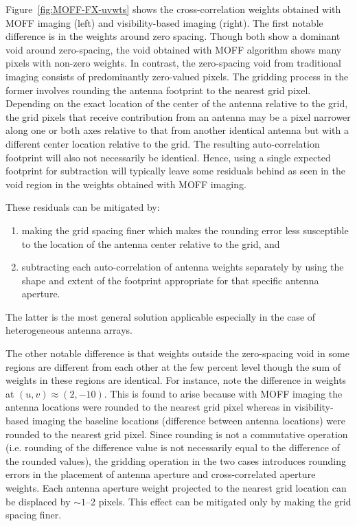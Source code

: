 \documentclass[a4paper,fleqn,usenatbib]{../mnras}
\begin{document}
Figure~\ref{fig:MOFF-FX-uvwts} shows the cross-correlation weights obtained 
with MOFF imaging (left) and visibility-based imaging (right). The first 
notable difference is in the weights around zero spacing. Though both show a
dominant void around zero-spacing, the void obtained with MOFF algorithm shows 
many pixels with non-zero weights. In contrast, the zero-spacing void from 
traditional imaging consists of predominantly zero-valued pixels. The gridding
process in the former involves rounding the antenna footprint to the nearest 
grid pixel. Depending on the exact location of the center of the antenna 
relative to the grid, the grid pixels that receive contribution from an
antenna may be a pixel narrower along one or both axes relative to that from
another identical antenna but with a different center location relative to the
grid. The resulting auto-correlation footprint will also not necessarily be 
identical. Hence, using a single expected footprint for subtraction will
typically leave some residuals behind as seen in the void region in the 
weights obtained with MOFF imaging. 

These residuals can be mitigated by: 
\begin{enumerate}
  \item making the grid spacing finer which makes the rounding error less 
    susceptible to the location of the antenna center relative to the grid, 
    and
  \item subtracting each auto-correlation of antenna weights separately by 
    using the shape and extent of the footprint appropriate for that specific
    antenna aperture. 
\end{enumerate}
The latter is the most general solution applicable especially in the case of 
heterogeneous antenna arrays.

The other notable difference is that weights outside the zero-spacing void in
some regions are different from each other at the few percent level though the 
sum of weights in these regions are identical. For instance, note the 
difference in weights at $(u,v)\approx (2,-10)$. This is found to arise 
because with MOFF imaging the antenna locations were rounded to the nearest 
grid pixel whereas in visibility-based imaging the baseline locations 
(difference between antenna locations) were rounded to the nearest grid pixel. 
Since rounding is not a commutative operation (i.e. rounding of the difference 
value is not necessarily equal to the difference of the rounded values), the 
gridding operation in the two cases introduces rounding errors in the placement 
of antenna aperture and cross-correlated aperture weights. Each antenna 
aperture weight projected to the nearest grid location can be displaced by 
$\sim 1$--2 pixels. This effect can be mitigated only by making the grid 
spacing finer. 
\end{document}

